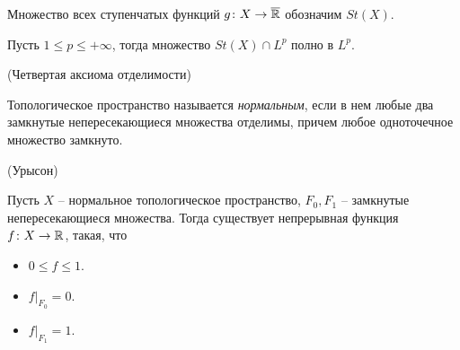\begin{definition}
    Множество всех ступенчатых функций $g \colon X \to \overline{\mathbb{R}}$
    обозначим $St(X)$.
\end{definition}

\begin{lemma}
    Пусть $1 \leqslant p \leqslant +\infty$, тогда множество
    $St(X) \cap L^p$ полно в $L^p$.
\end{lemma}

\begin{definition}(Четвертая аксиома отделимости)
    
    Топологическое пространство называется \textit{нормальным},
    если в нем любые два замкнутые непересекающиеся множества
    отделимы, причем любое одноточечное множество замкнуто.
\end{definition}

\begin{lemma}(Урысон)
    
    Пусть $X$ -- нормальное топологическое пространство, 
    $F_0, F_1$ -- замкнутые непересекающиеся множества. Тогда
    существует непрерывная функция $f \colon X \to \mathbb{R}$, такая, что
    \begin{itemize}
        \item $0 \leqslant f \leqslant 1$.
        \item $f\big|_{F_0} = 0$.
        \item $f\big|_{F_1} = 1$.
    \end{itemize} 
\end{lemma}
